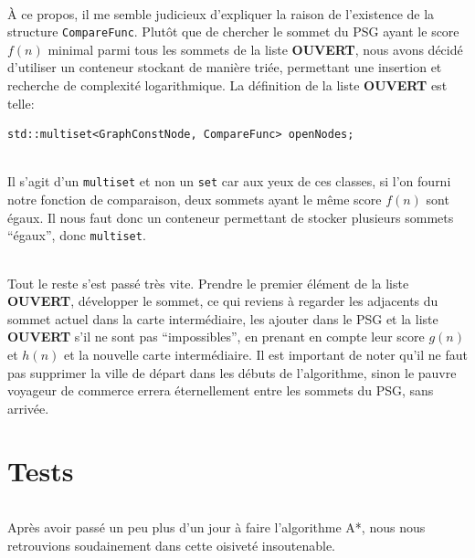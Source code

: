 \documentclass[french]{article}
\begin{document}
\paragraph{} À ce propos, il me semble judicieux d'expliquer la raison de
l'existence de la structure \texttt{CompareFunc}. Plutôt que de chercher le
sommet du PSG ayant le score $f(n)$ minimal parmi tous les sommets de la liste
\textbf{OUVERT}, nous avons décidé d'utiliser un conteneur stockant de manière
triée, permettant une insertion et recherche de complexité logarithmique. La
définition de la liste \textbf{\Large{OUVERT}} est telle:

\begin{verbatim}
std::multiset<GraphConstNode, CompareFunc> openNodes;
\end{verbatim}

\paragraph{} Il s'agit d'un \texttt{multiset} et non un \texttt{set} car aux
yeux de ces classes, si l'on fourni notre fonction de comparaison, deux sommets
ayant le même score $f(n)$ sont égaux. Il nous faut donc un conteneur
permettant de stocker plusieurs sommets ``égaux'', donc \texttt{multiset}.

\paragraph{} Tout le reste s'est passé très vite. Prendre le premier élément de
la liste \textbf{\huge{OUVERT}}, développer le sommet, ce qui reviens à
regarder les adjacents du sommet actuel dans la carte intermédiaire, les
ajouter dans le PSG et la liste \textbf{\Huge{OUVERT}} s'il ne sont pas
``impossibles'', en prenant en compte leur score $g(n)$ et $h(n)$ et la
nouvelle carte intermédiaire. Il est important de noter qu'il ne faut pas
supprimer la ville de départ dans les débuts de l'algorithme, sinon le pauvre
voyageur de commerce errera éternellement entre les sommets du PSG, sans
arrivée.

\part{Tests}

\paragraph{} Après avoir passé un peu plus d'un jour à faire l'algorithme A*,
nous nous retrouvions soudainement dans cette oisiveté insoutenable.
\end{document}
